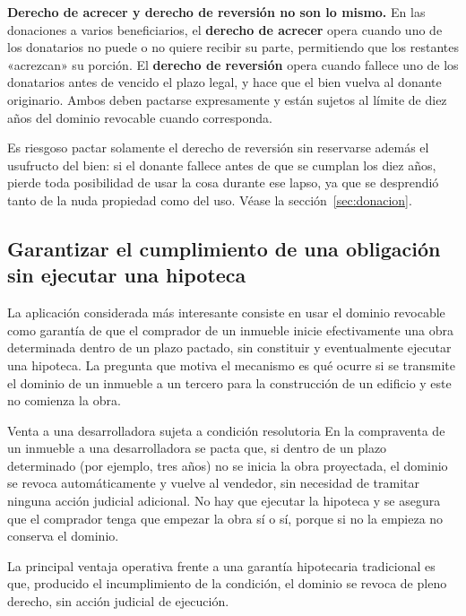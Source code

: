 \documentclass[12pt,oneside]{book}
\begin{document}
\begin{note}
\textbf{Derecho de acrecer y derecho de reversión no son lo mismo.} En las donaciones a varios beneficiarios, el \textbf{derecho de acrecer} opera cuando uno de los donatarios no puede o no quiere recibir su parte, permitiendo que los restantes «acrezcan» su porción. El \textbf{derecho de reversión} opera cuando fallece uno de los donatarios antes de vencido el plazo legal, y hace que el bien vuelva al donante originario. Ambos deben pactarse expresamente y están sujetos al límite de diez años del dominio revocable cuando corresponda.
\end{note}

\begin{warning}
Es riesgoso pactar solamente el derecho de reversión sin reservarse además el usufructo del bien: si el donante fallece antes de que se cumplan los diez años, pierde toda posibilidad de usar la cosa durante ese lapso, ya que se desprendió tanto de la nuda propiedad como del uso. Véase la sección~\ref{sec:donacion}.
\end{warning}

\subsection{Garantizar el cumplimiento de una obligación sin ejecutar una hipoteca}

La aplicación considerada más interesante consiste en usar el dominio revocable como garantía de que el comprador de un inmueble inicie efectivamente una obra determinada dentro de un plazo pactado, sin constituir y eventualmente ejecutar una hipoteca. La pregunta que motiva el mecanismo es qué ocurre si se transmite el dominio de un inmueble a un tercero para la construcción de un edificio y este no comienza la obra.

\begin{example}{Venta a una desarrolladora sujeta a condición resolutoria}
En la compraventa de un inmueble a una desarrolladora se pacta que, si dentro de un plazo determinado (por ejemplo, tres años) no se inicia la obra proyectada, el dominio se revoca automáticamente y vuelve al vendedor, sin necesidad de tramitar ninguna acción judicial adicional. No hay que ejecutar la hipoteca y se asegura que el comprador tenga que empezar la obra sí o sí, porque si no la empieza no conserva el dominio.
\end{example}

La principal ventaja operativa frente a una garantía hipotecaria tradicional es que, producido el incumplimiento de la condición, el dominio se revoca de pleno derecho, sin acción judicial de ejecución.
\end{document}
